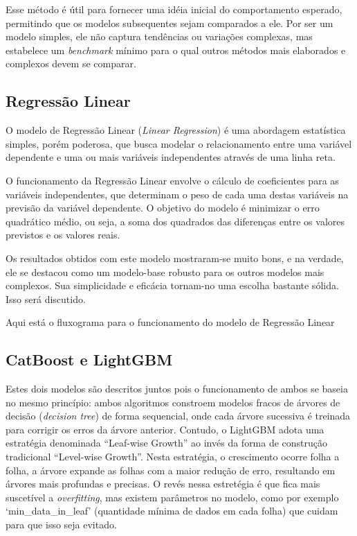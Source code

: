 Esse método é útil para fornecer uma idéia inicial do comportamento esperado, permitindo que os modelos subsequentes sejam comparados a ele. Por ser um modelo simples, ele não captura tendências ou variações complexas, mas estabelece um \textit{benchmark} mínimo para o qual outros métodos mais elaborados e complexos devem se comparar.

\subsection{Regressão Linear}

O modelo de Regressão Linear (\textit{Linear Regression}) é uma abordagem estatística simples, porém poderosa, que busca modelar o relacionamento entre uma variável dependente e uma ou mais variáveis independentes através de uma linha reta. 

O funcionamento da Regressão Linear envolve o cálculo de coeficientes para as variáveis independentes, que determinam o peso de cada uma destas variáveis na previsão da variável dependente. O objetivo do modelo é minimizar o erro quadrático médio, ou seja, a soma dos quadrados das diferenças entre os valores previstos e os valores reais.\cite{hyndman_fpp3_2024}

Os resultados obtidos com este modelo mostraram-se muito bons, e na verdade, ele se destacou como um modelo-base robusto para os outros modelos mais complexos. Sua simplicidade e eficácia tornam-no uma escolha bastante sólida. Isso será discutido.

Aqui está o fluxograma para o funcionamento do modelo de Regressão Linear 

\subsection{CatBoost e LightGBM}

Estes dois modelos são descritos juntos pois o funcionamento de ambos se baseia no mesmo princípio: ambos algoritmos constroem modelos fracos de árvores de decisão (\textit{decision tree}) de forma sequencial, onde cada árvore sucessiva é treinada para corrigir os erros da árvore anterior. Contudo, o LightGBM adota uma estratégia denominada ``Leaf-wise Growth'' ao invés da forma de construção tradicional ``Level-wise Growth''. Nesta estratégia, o crescimento ocorre folha a folha, a árvore expande as folhas com a maior redução de erro, resultando em árvores mais profundas e precisas.\cite{ke2017lightgbm}\cite{LightGBM} O revés nessa estretégia é que fica mais suscetível a \textit{overfitting}, mas existem parâmetros no modelo, como por exemplo `min\_data\_in\_leaf' (quantidade mínima de dados em cada folha) que cuidam para que isso seja evitado.

